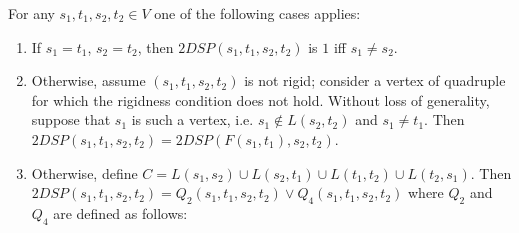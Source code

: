 \begin{theorem} \label{main_theorem}
For any $s_1, t_1, s_2, t_2 \in V$ one of the following cases applies:
\begin{enumerate} 
\item If $s_1 = t_1$, $s_2 = t_2$, then $2DSP(s_1, t_1, s_2, t_2)$ is $1$ iff $s_1 \neq s_2$.
\item Otherwise, assume $(s_1, t_1, s_2, t_2)$ is not rigid; consider a vertex of quadruple for which the rigidness condition does not hold. Without loss of generality, suppose that $s_1$ is such a vertex, i.e. $s_1 \notin L(s_2, t_2)$ and $s_1 \neq t_1$. Then $2DSP(s_1, t_1, s_2, t_2) = 2DSP(F(s_1, t_1), s_2, t_2)$.
\item Otherwise, define $C = L(s_1, s_2) \cup L(s_2, t_1) \cup L(t_1, t_2) \cup L(t_2, s_1)$. Then $2DSP(s_1, t_1, s_2, t_2) = Q_2(s_1, t_1, s_2, t_2) \vee Q_4(s_1, t_1, s_2, t_2)$ where $Q_2$ and $Q_4$ are defined as follows:


\end{enumerate}
\end{theorem}
